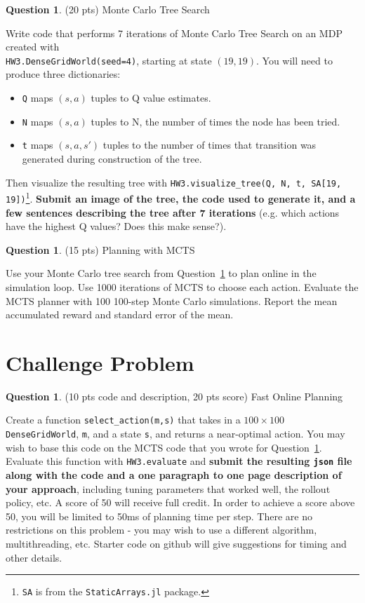 \documentclass{article}
\theoremstyle{definition}
\newtheorem{question}[thm]{Question}
\begin{document}
\begin{question} \label{q:mcts} (20 pts) Monte Carlo Tree Search
    
    Write code that performs 7 iterations of Monte Carlo Tree Search on an MDP created with \\
    \texttt{HW3.DenseGridWorld(seed=4)},
    starting at state $(19, 19)$. You will need to produce three dictionaries:
    \begin{itemize}[noitemsep]
        \item \texttt{Q} maps $(s, a)$ tuples to Q value estimates.
        \item \texttt{N} maps $(s, a)$ tuples to N, the number of times the node has been tried.
        \item \texttt{t} maps $(s, a, s')$ tuples to the number of times that transition was generated during construction of the tree.
    \end{itemize}
    Then visualize the resulting tree with \texttt{HW3.visualize\_tree(Q, N, t, SA[19, 19])}\footnote{\texttt{SA} is from the \texttt{StaticArrays.jl} package.}. \textbf{Submit an image of the tree, the code used to generate it, and a few sentences describing the tree after 7 iterations} (e.g. which actions have the highest Q values? Does this make sense?).
    
\end{question}

\begin{question}
    (15 pts) Planning with MCTS

    Use your Monte Carlo tree search from Question~\ref{q:mcts} to plan online in the simulation loop. Use 1000 iterations of MCTS to choose each action. Evaluate the MCTS planner with 100 100-step Monte Carlo simulations. Report the mean accumulated reward and standard error of the mean.
\end{question}

\section{Challenge Problem}

\begin{question}
    (10 pts code and description, 20 pts score) Fast Online Planning
    
    Create a function \texttt{select\_action(m,s)} that takes in a $100 \times 100$ \texttt{DenseGridWorld}, \texttt{m}, and a state \texttt{s}, and returns a near-optimal action. You may wish to base this code on the MCTS code that you wrote for Question~\ref{q:mcts}. Evaluate this function with \texttt{HW3.evaluate} and \textbf{submit the resulting \texttt{json} file along with the code and a one paragraph to one page description of your approach}, including tuning parameters that worked well, the rollout policy, etc. A score of 50 will receive full credit. In order to achieve a score above 50, you will be limited to 50ms of planning time per step. There are no restrictions on this problem - you may wish to use a different algorithm, multithreading, etc. Starter code on github will give suggestions for timing and other details.
\end{question}
\end{document}
